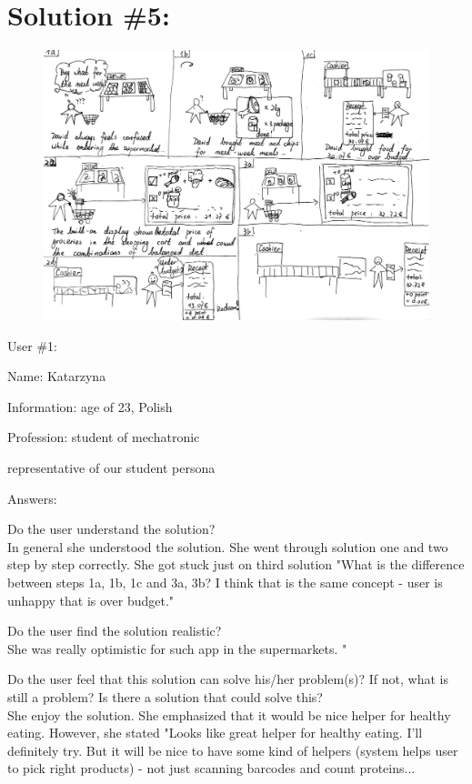 \documentclass[a4paper,10pt,oneside]{scrreprt}
\begin{document}
\clearpage
\section{Solution \#5:}


\begin{figure}[H]
	\centering
	\includegraphics[scale=0.4, clip, trim={0em 0em 0em 0em}]{images/s5.jpg}
\end{figure}


User \#1:
\begin{compactitem}
	\item Name: Katarzyna
	\item Information: age of 23, Polish
	\item Profession: student of mechatronic
	\item representative of our student persona
\end{compactitem}
\bigskip

Answers:
\begin{compactitem}
	\item Do the user understand the solution?\\
	In general she understood the solution. She went through solution one and two  step by step correctly. She got stuck just on third solution "What is the difference between steps 1a, 1b, 1c and 3a, 3b? I think that is the same concept - user is unhappy that is over budget."\\
	
	
	\item Do the user find the solution realistic?\\
	She was really optimistic for such app in the supermarkets. "\\
	
	\item Do the user feel that this solution can solve his/her problem(s)? If not, what is still
	a problem? Is there a solution that could solve this?\\
She enjoy the solution. She emphasized that it would be nice helper for healthy eating. However, she stated "Looks like great helper for healthy eating. I'll definitely try. But it will be nice to have some kind of helpers (system helps user to pick right products) - not just scanning barcodes and count proteins...
\\
\end{compactitem}
\bigskip
\end{document}
